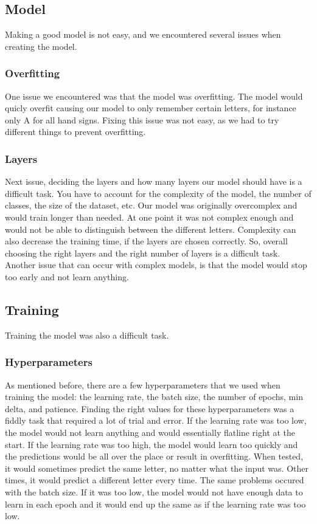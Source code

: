 \documentclass[../paper.tex]{subfiles}
\begin{document}
\subsection{Model}
Making a good model is not easy, and we encountered several issues when creating the model.
\subsubsection{Overfitting}
One issue we encountered was that the model was overfitting. 
The model would quicly overfit causing our model to only remember certain letters, for instance only A for all hand signs.
Fixing this issue was not easy, as we had to try different things to prevent overfitting.
\subsubsection{Layers}
Next issue, deciding the layers and how many layers our model should have is a difficult task.
You have to account for the complexity of the model, the number of classes, the size of the dataset, etc.
Our model was originally overcomplex and would train longer than needed. 
At one point it was not complex enough and would not be able to distinguish between the different letters.
Complexity can also decrease the training time, if the layers are chosen correctly.
So, overall choosing the right layers and the right number of layers is a difficult task.
Another issue that can occur with complex models, is that the model would stop too early and not learn anything.
\subsection{Training}
Training the model was also a difficult task.
\subsubsection{Hyperparameters}
As mentioned before, there are a few hyperparameters that we used when training the model: the learning rate, the batch size, the number of epochs, min delta, and patience.
Finding the right values for these hyperparameters was a fiddly task that required a lot of trial and error. 
If the learning rate was too low, the model would not learn anything
and would essentially flatline right at the start. 
If the learning rate was too high, the model would learn too quickly and the predictions would be all over the place or result in overfitting.
When tested, it would sometimes predict the same letter, no matter what the input was. 
Other times, it would predict a different letter every time.
The same problems occured with the batch size. 
If it was too low, the model would not have enough data to learn in each epoch and it would end up the same as if the learning rate was too low.
\end{document}
